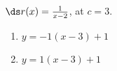 {$\ds r(x) = \frac1{x-2}$, at $c=3$.
}
{\begin{enumerate}
\item		$y = -1(x-3)+1$
\item		$y = 1(x-3)+1$
\end{enumerate}
}
